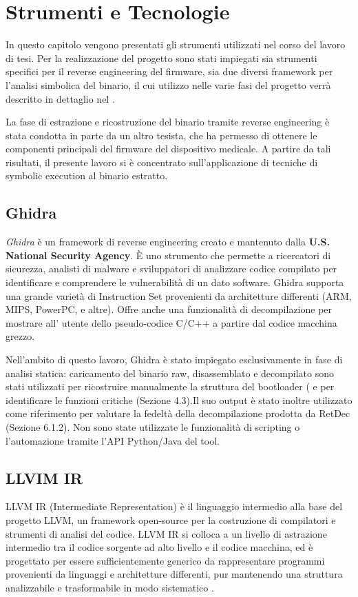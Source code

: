 \section{Strumenti e Tecnologie}
\label{subsec:strumenti_e_tecnologie}
In questo capitolo vengono presentati gli strumenti utilizzati nel corso del lavoro di tesi. Per la realizzazione del progetto sono stati impiegati sia strumenti specifici per il reverse engineering del firmware, sia due diversi framework per l'analisi simbolica del binario, il cui utilizzo nelle varie fasi del progetto verrà descritto in dettaglio nel  .

La fase di estrazione e ricostruzione del binario tramite reverse engineering è stata condotta in parte da un altro tesista, che ha permesso di ottenere le componenti principali del firmware del dispositivo medicale. A partire da tali risultati, il presente lavoro si è concentrato sull'applicazione di tecniche di symbolic execution al binario estratto.

\subsection{Ghidra}
\label{subsec:ghidra}
\textit{Ghidra} è un framework di reverse engineering creato e mantenuto dalla \textbf{U.S. National Security Agency}. È uno strumento che permette a ricercatori di sicurezza, analisti di malware e sviluppatori di analizzare codice compilato per identificare e comprendere le vulnerabilità di un dato software. Ghidra supporta una grande varietà di Instruction Set provenienti da architetture differenti (ARM, MIPS, PowerPC, e altre). Offre anche una funzionalità di decompilazione per mostrare all' utente dello pseudo-codice C/C++ a partire dal codice macchina grezzo.~\cite{ghidra}

Nell'ambito di questo lavoro, Ghidra è stato impiegato esclusivamente in fase di analisi statica: caricamento del binario raw, disassemblato e decompilato sono stati utilizzati per ricostruire manualmente la struttura del bootloader ( e per identificare le funzioni critiche (Sezione 4.3).Il suo output è stato inoltre utilizzato come riferimento per valutare la fedeltà della decompilazione prodotta da RetDec (Sezione 6.1.2). Non sono state utilizzate le funzionalità di scripting o l'automazione tramite l'API Python/Java del tool.

\subsection{LLVIM IR}
\label{subsec:llvm_ir}
LLVM IR (Intermediate Representation) è il linguaggio intermedio alla base del progetto LLVM, un framework open-source per la costruzione di compilatori e strumenti di analisi del codice. LLVM IR si colloca a un livello di astrazione intermedio tra il codice sorgente ad alto livello e il codice macchina, ed è progettato per essere sufficientemente generico da rappresentare programmi provenienti da linguaggi e architetture differenti, pur mantenendo una struttura analizzabile e trasformabile in modo sistematico \cite{llvm}.

